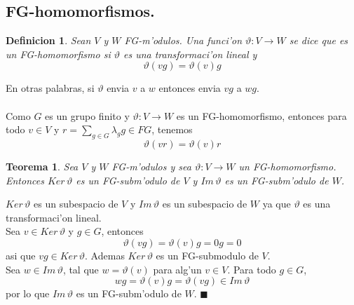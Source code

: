 \documentclass[a4paper,openright,12pt]{report}
\numberwithin{equation}{section} %
\newtheorem{teorema}{Teorema}[section] %
\newtheorem{definicion}{Definicion}[section] %
\newenvironment{proof}{\noindent{\it Demostracion:}}{\hfill$\blacksquare$} %
\begin{document}
\subsection{FG-homomorfismos.}
\begin{definicion}
Sean $V$ y $W$ FG-m'odulos. Una funci'on $\vartheta : V \rightarrow W$ se dice que es un FG-homomorfismo si $\vartheta$ es una transformaci'on lineal y 
\[
\vartheta (vg) = \vartheta (v)g
\]
\end{definicion}
En otras palabras, si $\vartheta$ envia $v$ a $w$ entonces envia $vg$ a $wg$.\\
\\
Como $G$ es un grupo finito y $\vartheta : V \rightarrow W$ es un FG-homomorfismo, entonces para todo $v \in V$ y $r=\sum_{g \in G} \lambda_{g}g \in FG$, tenemos
\[
\vartheta (vr) = \vartheta (v)r
\]
\begin{teorema}
Sea $V$ y $W$ FG-m'odulos y sea $\vartheta : V \rightarrow W$ un FG-homomorfismo. Entonces $Ker \, \vartheta$ es un FG-subm'odulo de $V$ y $Im \, \vartheta$ es un FG-subm'odulo de $W$.
\end{teorema}
\begin{proof}
$Ker \, \vartheta$ es un subespacio de $V$ y $Im \, \vartheta$ es un subespacio de $W$ ya que $\vartheta$ es una transformaci'on lineal.\\
Sea $v \in Ker \, \vartheta$ y $g \in G$, entonces
\[
\vartheta (vg) = \vartheta (v)g = 0g = 0
\]
asi que $vg \in Ker \, \vartheta$. Ademas $Ker \, \vartheta$ es un FG-submodulo de $V$.\\
Sea $w \in Im \, \vartheta$, tal que $w = \vartheta (v)$ para alg'un $v \in V$. Para todo $g \in G$,
\[
wg = \vartheta (v)g = \vartheta (vg) \in Im \, \vartheta
\]
por lo que $Im \, \vartheta$ es un FG-subm'odulo de $W$.
\end{proof}
\end{document}
